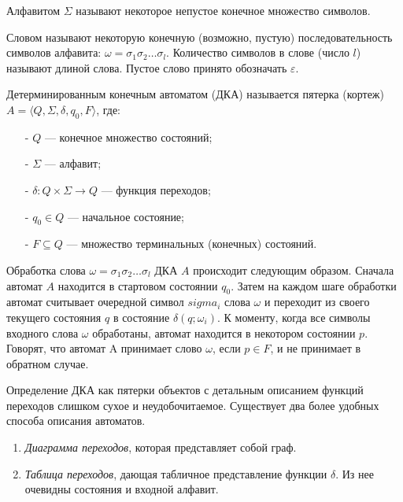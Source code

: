\begin{Def}
 Алфавитом $\Sigma$ называют некоторое непустое конечное множество символов.
\end{Def}

\begin{Def}
 Словом называют некоторую конечную (возможно, пустую) последовательность символов алфавита: $\omega = \sigma_1\sigma_2\dots\sigma_l$. 
 Количество символов в слове (число $l$) называют длиной слова. 
 Пустое слово принято обозначать $\varepsilon$.
\end{Def}

\begin{Def}
 Детерминированным конечным автоматом (ДКА) называется пятерка (кортеж) $A = \langle Q, \Sigma, \delta, q_0, F  \rangle$, где:
 \begin{itemize}
  \item [-] $Q$ --- конечное множество состояний;
  \item [-] $\Sigma$ --- алфавит;
  \item [-] $\delta : Q \times \Sigma \rightarrow Q$ --- функция переходов;
  \item [-] $q_0 \in Q$ --- начальное состояние;
  \item [-] $F \subseteq Q$ --- множество терминальных (конечных) состояний.
 \end{itemize}
\end{Def}

Обработка слова $\omega = \sigma_1\sigma_2\dots\sigma_l$ ДКА $A$ происходит следующим образом. 
Сначала автомат $A$ находится в стартовом состоянии $q_0$. 
Затем на каждом шаге обработки автомат считывает очередной символ $sigma_i$ слова $\omega$ и переходит из своего текущего состояния $q$ в состояние $\delta(q; \omega_i)$. 
К моменту, когда все символы входного слова $\omega$ обработаны, автомат находится в некотором состоянии $p$. Говорят, что автомат A принимает слово $\omega$, если $p \in F$, и не принимает в обратном случае.\cite{TA-defs}

Определение ДКА как пятерки объектов с детальным описанием функций переходов слишком сухое и неудобочитаемое.
Существует два более удобных способа описания автоматов.
\begin{enumerate}
 \item \textit{Диаграмма переходов}, которая представляет собой граф.
 \item \textit{Таблица переходов}, дающая табличное представление функции $\delta$.
 Из нее очевидны состояния и входной алфавит.
\end{enumerate}

